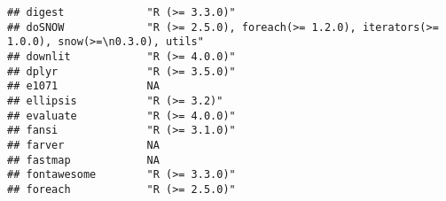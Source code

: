 \documentclass[
]{article}
\begin{document}
\begin{verbatim}
## digest             "R (>= 3.3.0)"                                                                                                                                                                                        
## doSNOW             "R (>= 2.5.0), foreach(>= 1.2.0), iterators(>= 1.0.0), snow(>=\n0.3.0), utils"                                                                                                                        
## downlit            "R (>= 4.0.0)"                                                                                                                                                                                        
## dplyr              "R (>= 3.5.0)"                                                                                                                                                                                        
## e1071              NA                                                                                                                                                                                                    
## ellipsis           "R (>= 3.2)"                                                                                                                                                                                          
## evaluate           "R (>= 4.0.0)"                                                                                                                                                                                        
## fansi              "R (>= 3.1.0)"                                                                                                                                                                                        
## farver             NA                                                                                                                                                                                                    
## fastmap            NA                                                                                                                                                                                                    
## fontawesome        "R (>= 3.3.0)"                                                                                                                                                                                        
## foreach            "R (>= 2.5.0)"                                                                                                                                                                                        

\end{verbatim}
\end{document}
